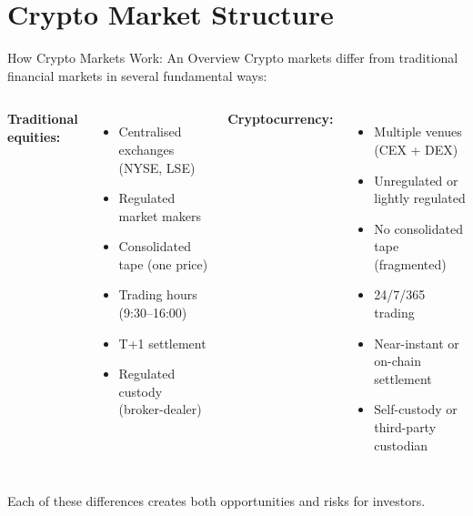 \documentclass[10pt]{beamer}
\newcommand{\good}[1]{\textcolor{AccentGreen}{#1}}
\newcommand{\bad}[1]{\textcolor{AccentOrange}{#1}}
\begin{document}
\section{Crypto Market Structure}

\begin{frame}{How Crypto Markets Work: An Overview}
  Crypto markets differ from traditional financial markets in several fundamental ways:
  
  \vspace{1em}
  \begin{columns}[T]
    \textbf{Traditional equities:}
    \begin{itemize}
      \item Centralised exchanges (NYSE, LSE)
      \item Regulated market makers
      \item Consolidated tape (one price)
      \item Trading hours (9:30--16:00)
      \item T+1 settlement
      \item Regulated custody (broker-dealer)
    \end{itemize}
    
    \textbf{Cryptocurrency:}
    \begin{itemize}
      \item Multiple venues (CEX + DEX)
      \item Unregulated or lightly regulated
      \item No consolidated tape (fragmented)
      \item 24/7/365 trading
      \item Near-instant or on-chain settlement
      \item Self-custody or third-party custodian
    \end{itemize}
  \end{columns}
  
  \vspace{1em}
  Each of these differences creates both \good{opportunities} and \bad{risks} for investors.
\end{frame}
\end{document}
